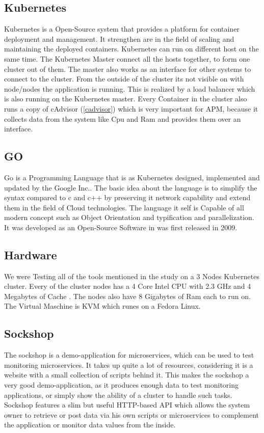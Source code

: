 \subsection{Kubernetes}
Kubernetes is a Open-Source system that provides a platform for container deployment and management. It strengthen are in the field of scaling and maintaining the deployed containers. Kubernetes can run on different host on the same time. The Kubernetes Master connect all the hosts together, to form one cluster out of them. The master also works as an interface for other systems to connect to the cluster. From the outside of the cluster its not visible on with node/nodes the application is running. This is realized by a load balancer which is also running on the Kubernetes master. Every Container in the cluster also runs a copy of cAdvisor (\ref{cadvisor}) which is very important for APM, because it collects data from the system like Cpu and Ram and provides them over an interface.
\subsection{GO}

Go is a Programming Language that is as Kubernetes designed, implemented and updated by the Google Inc.. The basic idea about the language is to simplify the syntax compared to c and c++ by preserving it network capability and extend them in the field of Cloud technologies. The language it self is Capable of all modern concept such as Object Orientation and typification and parallelization. It was developed as an Open-Source Software in was first released in 2009.  

\subsection{Hardware}
We were Testing all of the tools mentioned in the study on a 3 Nodes Kubernetes cluster. Every of the cluster nodes has a 4 Core Intel CPU with 2.3 GHz and 4 Megabytes of Cache . The nodes also have 8 Gigabytes of Ram  each to run on. The Virtual Maschine is KVM which runes on a Fedora Linux.

\subsection{Sockshop}
The sockshop is a demo-application for microservices, which can be used to test monitoring microservices. It takes up quite a lot of resources, considering it is a website with a small collection of scripts behind it. This makes the sockshop a very good demo-application, as it produces enough data to test monitoring applications, or simply show the ability of a cluster to handle such tasks.
Sockshop features a slim but useful HTTP-based API which allows the system owner to retrieve or post data via his own scripts or microservices to complement the application or monitor data values from the inside.
